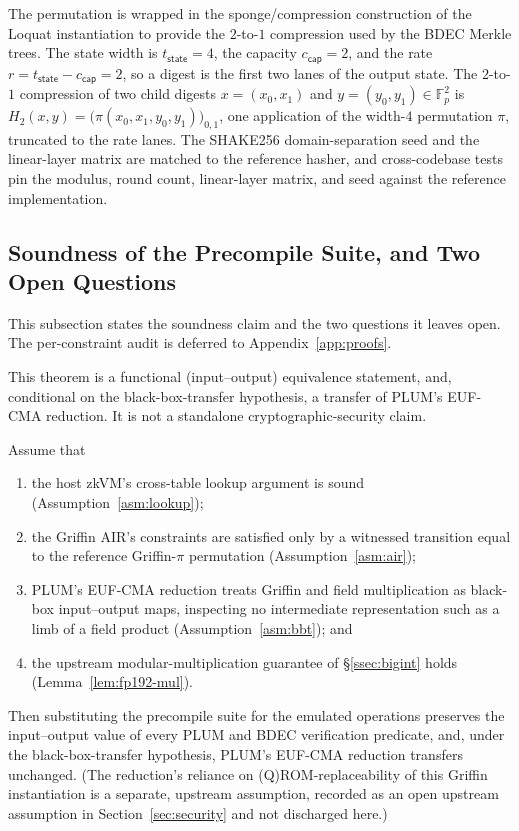 The permutation is wrapped in the sponge/compression construction of the Loquat instantiation to provide the $2$-to-$1$ compression used by the BDEC Merkle trees. The state width is $t_{\mathsf{state}}=4$, the capacity $c_{\mathsf{cap}}=2$, and the rate $r=t_{\mathsf{state}}-c_{\mathsf{cap}}=2$, so a digest is the first two lanes of the output state. The $2$-to-$1$ compression of two child digests $x=(x_0,x_1)$ and $y=(y_0,y_1)\in\mathbb{F}_p^{2}$ is $H_2(x,y)=\big(\pi(x_0,x_1,y_0,y_1)\big)_{0,1}$, one application of the width-$4$ permutation $\pi$, truncated to the rate lanes. The SHAKE256 domain-separation seed and the linear-layer matrix are matched to the reference hasher, and cross-codebase tests pin the modulus, round count, linear-layer matrix, and seed against the reference implementation.

\subsection{Soundness of the Precompile Suite, and Two Open Questions}\label{ssec:soundness}
This subsection states the soundness claim and the two questions it leaves open. The per-constraint audit is deferred to Appendix~\ref{app:proofs}.

This theorem is a functional (input--output) equivalence statement, and, conditional on the black-box-transfer hypothesis, a transfer of PLUM's EUF-CMA reduction. It is not a standalone cryptographic-security claim.

\begin{theorem}\label{thm:precompile-sound}
Assume that
\begin{enumerate}
  \item the host zkVM's cross-table lookup argument is sound (Assumption~\ref{asm:lookup});
  \item the Griffin AIR's constraints are satisfied only by a witnessed transition equal to the reference Griffin-$\pi$ permutation (Assumption~\ref{asm:air});
  \item PLUM's EUF-CMA reduction treats Griffin and field multiplication as black-box input--output maps, inspecting no intermediate representation such as a limb of a field product (Assumption~\ref{asm:bbt}); and
  \item the upstream modular-multiplication guarantee of \S\ref{ssec:bigint} holds (Lemma~\ref{lem:fp192-mul}).
\end{enumerate}
Then substituting the precompile suite for the emulated operations preserves the input--output value of every PLUM and BDEC verification predicate, and, under the black-box-transfer hypothesis, PLUM's EUF-CMA reduction transfers unchanged. (The reduction's reliance on (Q)ROM-replaceability of this Griffin instantiation is a separate, upstream assumption, recorded as an open upstream assumption in Section~\ref{sec:security} and not discharged here.)
\end{theorem}

